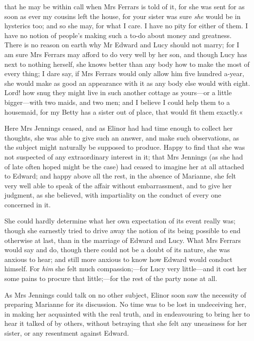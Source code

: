 that he may be within call when Mrs Ferrars is told of it, for she was sent for as soon as ever my cousins left the house, for your sister was sure \textit{she} would be in hysterics too; and so she may, for what I care. I have no pity for either of them. I have no notion of people’s making such a to-do about money and greatness. There is no reason on earth why Mr Edward and Lucy should not marry; for I am sure Mrs Ferrars may afford to do very well by her son, and though Lucy has next to nothing herself, she knows better than any body how to make the most of every thing; I dare say, if Mrs Ferrars would only allow him five hundred a-year, she would make as good an appearance with it as any body else would with eight. Lord! how snug they might live in such another cottage as yours—or a little bigger—with two maids, and two men; and I believe I could help them to a housemaid, for my Betty has a sister out of place, that would fit them exactly.«

Here Mrs Jennings ceased, and as Elinor had had time enough to collect her thoughts, she was able to give such an answer, and make such observations, as the subject might naturally be supposed to produce. Happy to find that she was not suspected of any extraordinary interest in it; that Mrs Jennings (as she had of late often hoped might be the case) had ceased to imagine her at all attached to Edward; and happy above all the rest, in the absence of Marianne, she felt very well able to speak of the affair without embarrassment, and to give her judgment, as she believed, with impartiality on the conduct of every one concerned in it.

She could hardly determine what her own expectation of its event really was; though she earnestly tried to drive away the notion of its being possible to end otherwise at last, than in the marriage of Edward and Lucy. What Mrs Ferrars would say and do, though there could not be a doubt of its nature, she was anxious to hear; and still more anxious to know how Edward would conduct himself. For \textit{him} she felt much compassion;—for Lucy very little—and it cost her some pains to procure that little;—for the rest of the party none at all.

As Mrs Jennings could talk on no other subject, Elinor soon saw the necessity of preparing Marianne for its discussion. No time was to be lost in undeceiving her, in making her acquainted with the real truth, and in endeavouring to bring her to hear it talked of by others, without betraying that she felt any uneasiness for her sister, or any resentment against Edward.

